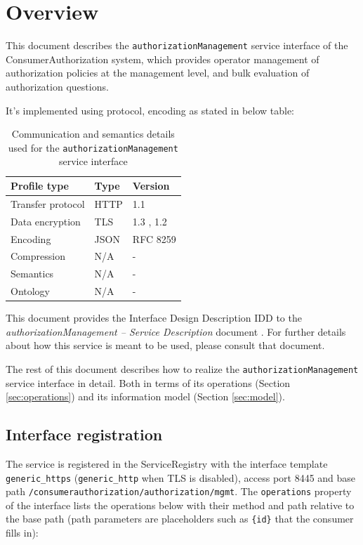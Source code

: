 \documentclass[a4paper]{arrowhead}
\begin{document}
\section{Overview}
\label{sec:overview}

This document describes the \texttt{authorization\allowbreak{}Management} service interface of the ConsumerAuthorization system, which provides operator management of authorization policies at the management level, and bulk evaluation of authorization questions.

It's implemented using protocol, encoding as stated in below table:
\begin{table}[ht!]
  \centering
  \begin{tabular}{|l|l|l|}
    \hline
    \rowcolor{gray!33} Profile type & Type & Version \\ \hline
    Transfer protocol & HTTP & 1.1 \cite{rfc9112} \\ \hline
    Data encryption & TLS & 1.3 \cite{rfc8446}, 1.2 \cite{rfc5246} \\ \hline
    Encoding & JSON & RFC 8259 \cite{rfc8259} \\ \hline
    Compression & N/A & - \\ \hline
    Semantics & N/A & - \\ \hline
    Ontology & N/A & - \\ \hline
  \end{tabular}
  \caption{Communication and semantics details used for the \texttt{authorization\allowbreak{}Management} service interface}
  \label{tab:comunication_semantics_profile}
\end{table}

This document provides the Interface Design Description IDD to the \textit{authorizationManagement -- Service Description} document \cite{ca-authorizationManagement-sd}.
For further details about how this service is meant to be used, please consult that document.

The rest of this document describes how to realize the \texttt{authorization\allowbreak{}Management} service
interface in detail. Both in terms of its operations (Section \ref{sec:operations}) and its information model (Section \ref{sec:model}).

\subsection{Interface registration}

The service is registered in the ServiceRegistry with the interface template \texttt{generic\_\allowbreak{}https} (\texttt{generic\_\allowbreak{}http} when TLS is disabled), access port 8445 and base path \texttt{/\allowbreak{}consumerauthorization/\allowbreak{}authorization/\allowbreak{}mgmt}. The \texttt{operations} property of the interface lists the operations below with their method and path relative to the base path (path parameters are placeholders such as \texttt{\{id\}} that the consumer fills in):
\end{document}
